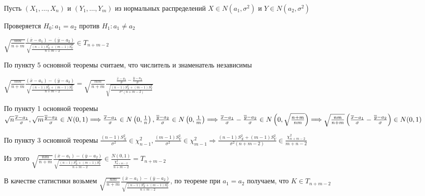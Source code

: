 \documentclass[12pt]{article}
\begin{document}
\begin{enumerate}
    Пусть $(X_1, \dots, X_n)$ и $(Y_1, \dots, Y_m)$ из нормальных распределений $X \in N(a_1, \sigma^2)$ и $Y \in N(a_2, \sigma^2)$

    Проверяется $H_0 : a_1 = a_2$ против $H_1 : a_1 \neq a_2$

    \begin{MyTheorem}
        \Ths $\sqrt{\frac{nm}{n + m}} \frac{(\overline x - a_1) - (\overline y - a_2)}{\sqrt{\frac{(n - 1) S_X^2 + (m - 1) S^2_Y}{n + m - 2}}} \in T_{n + m - 2}$
    \end{MyTheorem}

    \begin{MyProof}
        По пункту 5 основной теоремы считаем, что числитель и знаменатель независимы 

        $\sqrt{\frac{nm}{n + m}} \frac{(\overline x - a_1) - (\overline y - a_2)}{\sqrt{\frac{(n - 1) S_X^2 + (m - 1) S^2_Y}{n + m - 2}}} = 
        \sqrt{\frac{nm}{n + m}} \frac{\frac{\overline x - a_1}{\sigma} - \frac{\overline y - a_2}{\sigma}}{\sqrt{\frac{(n - 1) S_X^2 + (m - 1) S^2_Y}{\sigma^2 (n + m - 2)}}}$

        По пункту 1 основной теоремы $\sqrt{n} \frac{\overline x - a_1}{\sigma}, \sqrt{m} \frac{\overline y - a_2}{\sigma} \in N(0, 1) \Longrightarrow \\
        \frac{\overline x - a_1}{\sigma} \in N\left(0, \frac{1}{n}\right), \frac{\overline y - a_2}{\sigma} \in N\left(0, \frac{1}{m}\right) \Longrightarrow \\
        \frac{\overline x - a_1}{\sigma} - \frac{\overline y - a_2}{\sigma} \in N\left(0, \sqrt{\frac{n + m}{nm}}\right) \Longrightarrow \\
        \sqrt{\frac{nm}{n + m}} \left(\frac{\overline x - a_1}{\sigma} - \frac{\overline y - a_2}{\sigma}\right) \in N(0, 1)$

        По пункту 3 основной теоремы $\frac{(n - 1)S^2_X}{\sigma^2} \in \chi^2_{n - 1}, \frac{(m - 1)S^2_Y}{\sigma^2} \in \chi^2_{m - 1} \Longrightarrow
        \frac{(n - 1) S_X^2 + (m - 1) S^2_Y}{\sigma^2 (n + m - 2)} \in \frac{\chi^2_{n + m - 2}}{m + n - 2}$

        Из этого $\sqrt{\frac{nm}{n + m}} \frac{(\overline x - a_1) - (\overline y - a_2)}{\sqrt{\frac{(n - 1) S_X^2 + (m - 1) S^2_Y}{n + m - 2}}} \in \frac{N(0, 1)}{\frac{\chi^2_{n + m - 2}}{n + m - 2}} = T_{n + m - 2}$
    \end{MyProof}

    В качестве статистики возьмем $\sqrt{\frac{nm}{n + m}} \frac{(\overline x - a_1) - (\overline y - a_2)}{\sqrt{\frac{(n - 1) S_X^2 + (m - 1) S^2_Y}{n + m - 2}}}$, 
    по теореме при $a_1 = a_2$ получаем, что $K \in T_{n + m - 2}$


\end{enumerate}
\end{document}
